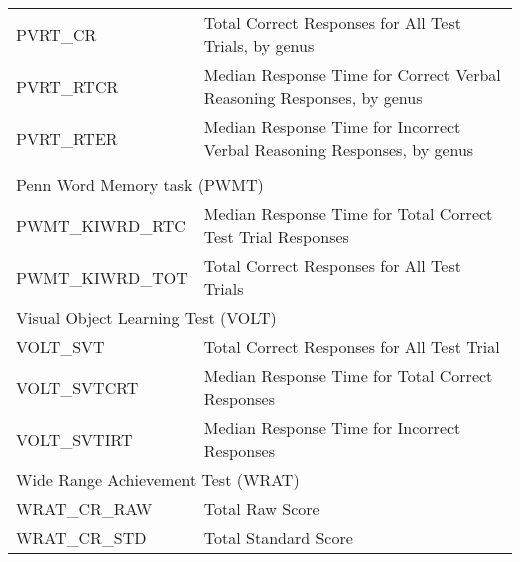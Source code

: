 \documentclass{article}
\begin{document}
\begin{longtable}{ll}
\midrule
PVRT\_CR & Total Correct Responses for All Test Trials, by genus\\
PVRT\_RTCR & Median Response Time for Correct Verbal Reasoning Responses, by genus\\
PVRT\_RTER & Median Response Time for Incorrect Verbal Reasoning Responses, by genus\\
\midrule
\\
\midrule %
\multicolumn{2}{l}{Penn Word Memory task (PWMT)}\\
\midrule
PWMT\_KIWRD\_RTC & Median Response Time for Total Correct Test Trial Responses\\
PWMT\_KIWRD\_TOT & Total Correct Responses for All Test Trials\\
\midrule
\multicolumn{2}{l}{Visual Object Learning Test (VOLT)}\\
\midrule
VOLT\_SVT & Total Correct Responses for All Test Trial\\
VOLT\_SVTCRT & Median Response Time for Total Correct Responses\\
VOLT\_SVTIRT & Median Response Time for Incorrect Responses\\
\midrule
\multicolumn{2}{l}{Wide Range Achievement Test (WRAT)}\\
\midrule
WRAT\_CR\_RAW & Total Raw Score\\
WRAT\_CR\_STD & Total Standard Score\\
\bottomrule
\end{longtable}
\end{document}

